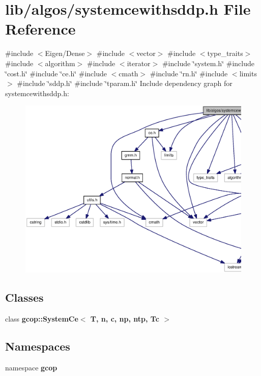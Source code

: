 \section{lib/algos/systemcewithsddp.h \-File \-Reference}
\label{systemcewithsddp_8h}
{\ttfamily \#include $<$\-Eigen/\-Dense$>$}\*
{\ttfamily \#include $<$vector$>$}\*
{\ttfamily \#include $<$type\-\_\-traits$>$}\*
{\ttfamily \#include $<$algorithm$>$}\*
{\ttfamily \#include $<$iterator$>$}\*
{\ttfamily \#include \char`\"{}system.\-h\char`\"{}}\*
{\ttfamily \#include \char`\"{}cost.\-h\char`\"{}}\*
{\ttfamily \#include \char`\"{}ce.\-h\char`\"{}}\*
{\ttfamily \#include $<$cmath$>$}\*
{\ttfamily \#include \char`\"{}rn.\-h\char`\"{}}\*
{\ttfamily \#include $<$limits$>$}\*
{\ttfamily \#include \char`\"{}sddp.\-h\char`\"{}}\*
{\ttfamily \#include \char`\"{}tparam.\-h\char`\"{}}\*
\-Include dependency graph for systemcewithsddp.\-h\-:
\nopagebreak
\begin{figure}[H]
\begin{center}
\leavevmode
\includegraphics[width=350pt]{systemcewithsddp_8h__incl}
\end{center}
\end{figure}
\subsection*{\-Classes}
\begin{DoxyCompactItemize}
\item 
class {\bf gcop\-::\-System\-Ce$<$ T, n, c, np, ntp, Tc $>$}
\end{DoxyCompactItemize}
\subsection*{\-Namespaces}
\begin{DoxyCompactItemize}
\item 
namespace {\bf gcop}
\end{DoxyCompactItemize}
